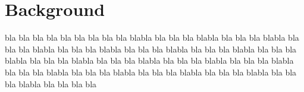 \section*{Background}
bla bla bla bla bla bla bla bla bla blabla bla bla bla blabla bla bla bla blabla bla bla bla blabla bla bla bla blabla bla bla bla blabla bla bla bla blabla bla bla bla blabla bla bla bla blabla bla bla bla blabla bla bla bla blabla bla bla bla blabla bla bla bla blabla bla bla bla blabla bla bla bla blabla bla bla bla blabla bla bla bla blabla bla bla bla bla